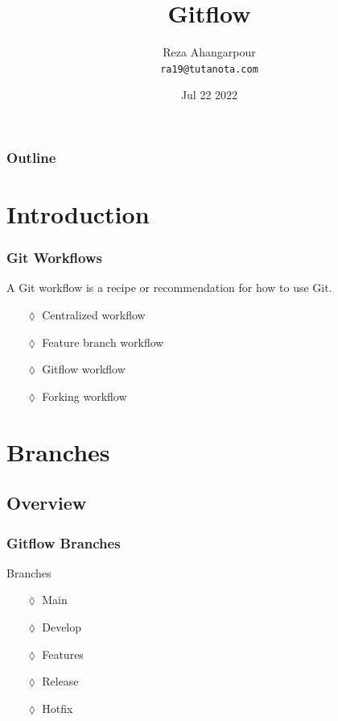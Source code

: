\documentclass[10pt]{beamer}
\title{Gitflow}
\author[R. Ahangarpour]{Reza Ahangarpour\\[2mm]\tiny{\texttt{ra19@tutanota.com}}}
\institute{Sharif University of Technology}
\date{Jul 22 2022}
\begin{document}
	\begin{frame}
		\titlepage
	\end{frame}
	\begin{frame}
		\frametitle{Outline}
		\tableofcontents[pausesections]
	\end{frame}
	\section{Introduction}
	\begin{frame}
		\frametitle{Git Workflows}
		\begin{definition}
			A \alert{Git workflow} is a recipe or recommendation for how to use Git.
		\end{definition}
		\pause
		\begin{example}
			\begin{itemize}
				\item[$\lozenge$] Centralized workflow \pause
				\item[$\lozenge$] Feature branch workflow \pause
				\item[$\lozenge$] \alert{Gitflow} workflow \pause
				\item[$\lozenge$] Forking workflow
			\end{itemize}
		\end{example}
	\end{frame}
	\section{Branches}
	\subsection{Overview}
	\begin{frame}
		\frametitle{Gitflow Branches}
		\begin{block}{Branches}
			\begin{itemize}
				\item[$\lozenge$] Main
				\item[$\lozenge$] Develop
				\item[$\lozenge$] Features
				\item[$\lozenge$] Release
				\item[$\lozenge$] Hotfix
			\end{itemize}
		\end{block}
	\end{frame}
\end{document}

